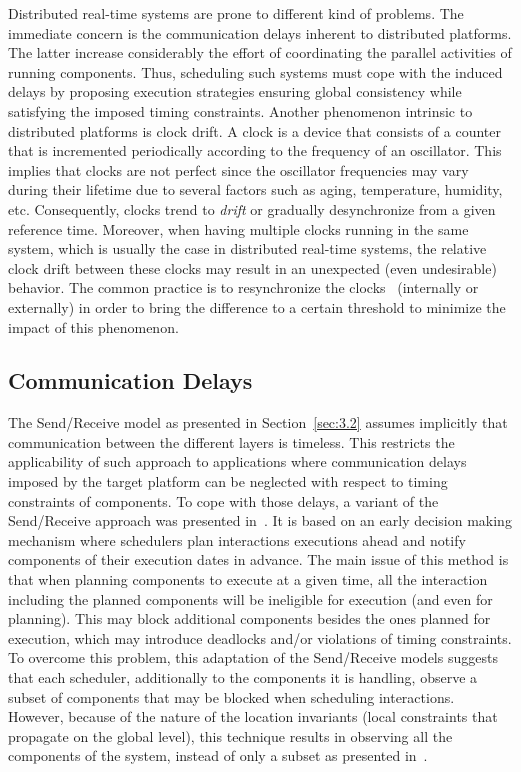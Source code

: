Distributed real-time systems are prone to different kind of problems. The immediate concern 
is the communication delays inherent to distributed platforms. The latter increase considerably
the effort of coordinating the parallel activities of running components. Thus, scheduling
such systems must cope with the induced delays by proposing execution strategies ensuring 
global consistency while satisfying the imposed timing constraints.
Another phenomenon intrinsic to distributed platforms is clock drift. A clock is a device
that consists of a counter that is incremented periodically according to the frequency of 
an oscillator. This implies that clocks are not perfect since the oscillator frequencies may
vary during their lifetime due to several factors such as aging, temperature, humidity, etc.
Consequently, clocks trend to \emph{drift} or gradually desynchronize from a given reference 
time. Moreover, when having multiple clocks running in the same system, which is usually the
case in distributed real-time systems, the relative clock drift between these clocks
may result in an unexpected (even undesirable) behavior. The common practice is to 
resynchronize the clocks~\cite{ptp} (internally or externally) in order to bring the difference 
to a certain threshold to minimize the impact of this phenomenon. 

\subsection{Communication Delays}

The Send/Receive model as presented in Section~\ref{sec:3.2} assumes implicitly that 
communication between the different layers is timeless. This restricts the applicability
of such approach to applications where communication delays imposed by the target platform 
can be neglected with respect to timing constraints of components.
To cope with those delays, a variant of the Send/Receive approach was presented 
in~\cite{ahlem_these}. 
It is based on an early decision making mechanism where schedulers plan interactions executions 
ahead and notify components of their execution dates in advance. 
The main issue of this method is that when planning components to execute at a given time,
all the interaction including the planned components will be ineligible for execution (and even
for planning). This may block additional components besides the ones planned for execution, 
which may introduce deadlocks and/or violations of timing constraints. To overcome this problem,
this adaptation of the Send/Receive models suggests that each scheduler, additionally to the
components it is handling, observe a subset of components that may be blocked when 
scheduling interactions. However, because of the nature of the location invariants (local
constraints that propagate on the global level), this technique results in observing
all the components of the system, instead of only a subset as presented in~\cite{ahlem_these}.

